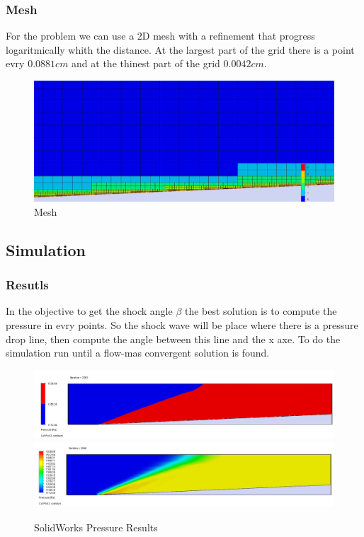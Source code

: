 \subsubsection{Mesh}
For the problem we can use a 2D mesh with a refinement that progress logaritmically whith the distance. At the largest part of the grid there is a point evry $0.0881cm$ and at the thinest part of the grid $0.0042cm$.
\begin{figure}[H]
	\centering
	\includegraphics[width=0.8\linewidth]{ressources/images/CFD/Maillage.jpg}
	\caption{Mesh}
	\label{fig:mesh}
\end{figure}


\subsection{Simulation}

\subsubsection{Resutls}
In the objective to get the shock angle $\beta$ the best solution is to compute the pressure in evry points. So the shock wave will be place where there is a pressure drop line, then compute the angle between this line and the x axe.
To do the simulation run until a flow-mas convergent solution is found.

\begin{figure}[H]
	\centering
	\includegraphics[width=0.8\linewidth]{ressources/images/CFD/SolidWorks1.jpg}
	\includegraphics[width=0.8\linewidth]{ressources/images/CFD/SolidWorks2.jpg}
	\caption{SolidWorks Pressure Results}
	\label{fig:resSW}
\end{figure}

